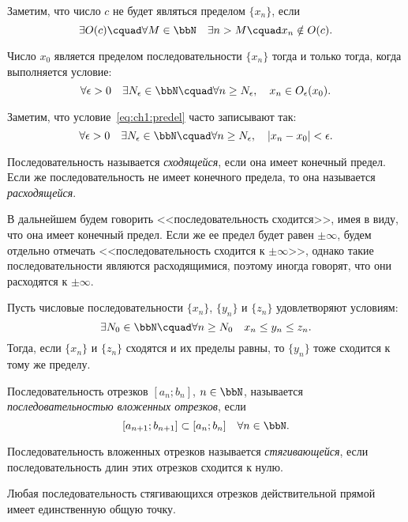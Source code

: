 Заметим, что число $c$ не будет являться пределом $\{x_n\}$, если 
$$
\exists O(c)\cquad \forall M \in \bbN\quad \exists n > M\cquad x_n \notin O(c).
$$
\begin{lemm}
Число $x_0$ является пределом последовательности $\{x_n\}$ тогда и только тогда, когда выполняется условие:
\begin{equation}
\label{eq:ch1:predel}
\forall \epsilon>0\quad \exists N_\epsilon \in \bbN\cquad \forall n \ge N_\epsilon,\quad x_n \in O_\epsilon(x_0).
\end{equation}
\end{lemm}
Заметим, что условие~\eqref{eq:ch1:predel} часто записывают так:
$$
\forall \epsilon>0\quad \exists N_\epsilon \in \bbN\cquad \forall n \ge N_\epsilon,\quad |x_n-x_0|<\epsilon.
$$
\begin{defn}
Последовательность называется \textit{сходящейся}, если она имеет конечный предел. Если же последовательность не имеет конечного предела, то она называется \textit{расходящейся}.
\end{defn}
В дальнейшем будем говорить <<последовательность сходится>>, имея в виду, что она имеет конечный предел. Если же ее предел будет равен $\pm\infty$, будем отдельно отмечать <<последовательность сходится к $\pm\infty$>>, однако такие последовательности являются расходящимися, поэтому иногда говорят, что они расходятся к $\pm\infty$. 
\begin{thm} \label{th:ch1:otrehposled}  
Пусть числовые последовательности $\{x_n\}$, $\{y_n\}$ и $\{z_n\}$ удовлетворяют условиям:
$$
\exists N_0 \in \bbN\cquad \forall n\ge N_0 \quad x_n \le y_n \le z_n.
$$
Тогда, если $\{x_n\}$ и $\{z_n\}$ сходятся и их пределы равны, то $\{y_n\}$ тоже сходится к тому же пределу.
\end{thm}

\begin{defn}
Последовательность отрезков $[a_n;b_n]$, $n \in \bbN$, называется \textit{последовательностью вложенных отрезков}, если
$$
[a_{n+1};b_{n+1}]\subset [a_n;b_n]\quad \forall n \in \bbN.
$$
\end{defn}

\begin{defn}
Последовательность вложенных отрезков называется \textit{стягивающейся}, если последовательность длин этих отрезков сходится к нулю.
\end{defn}

\begin{thm}
\label{th:ch1:poslstyag}
Любая последовательность стягивающихся отрезков действительной прямой имеет единственную общую точку.
\end{thm}

